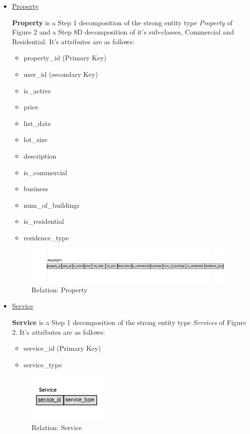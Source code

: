 \documentclass[12pt,a4paper]{report}
\begin{document}
\begin{itemize}
\item \underline{Property} \par 
\textbf{Property} is a Step 1 decomposition of the strong entity type \textit{Property} of Figure 2 and a Step 8D decomposition of it's sub-classes, Commercial and Residential. It's attributes are as follows:
\begin{itemize}
\item property\_id (Primary Key)
\item user\_id (secondary Key)
\item is\_active
\item price
\item list\_date
\item lot\_size
\item description
\item is\_commercial
\item business
\item num\_of\_buildings
\item is\_residential
\item residence\_type
\end{itemize}
\begin{figure}[H]
\centering
\includegraphics[scale=1.0]{property.png}
\caption{Relation: Property}
\label{Figure:property}
\end{figure} 

\item \underline{Service} \par 
\textbf{Service} is a Step 1 decomposition of the strong entity type \textit{Services} of Figure 2. It's attributes are as follows:
\begin{itemize}
\item service\_id (Primary Key)
\item service\_type
\end{itemize}
\begin{figure}[H]
\centering
\includegraphics[scale=1.5]{service.png}
\caption{Relation: Service}
\label{Figure:service}
\end{figure}  


\end{itemize}
\end{document}
